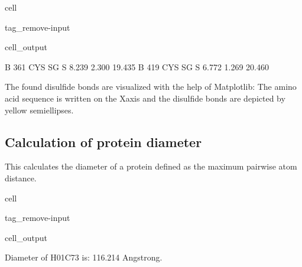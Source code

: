 \documentclass[letterpaper,10pt,english]{jupyterBook}
\begin{document}
\begin{sphinxuseclass}{cell}
\begin{sphinxuseclass}{tag_remove-input}\begin{sphinxVerbatimOutput}

\begin{sphinxuseclass}{cell_output}
\begin{sphinxVerbatim}[commandchars=\\\{\}]
    B     361  CYS SG     S        \PYGZhy{}8.239    2.300   19.435
    B     419  CYS SG     S        \PYGZhy{}6.772    1.269   20.460
\end{sphinxVerbatim}

\noindent{}

\end{sphinxuseclass}\end{sphinxVerbatimOutput}

\end{sphinxuseclass}
\end{sphinxuseclass}
\sphinxAtStartPar
The found disulfide bonds are visualized with the help of Matplotlib: The amino acid sequence is written on the X\sphinxhyphen{}axis and the disulfide bonds are depicted by yellow semi\sphinxhyphen{}ellipses.


\subsection{Calculation of protein diameter}
\label{\detokenize{ipynb/chapter1:calculation-of-protein-diameter}}
\sphinxAtStartPar
This calculates the diameter of a protein defined as the maximum pairwise atom distance.

\begin{sphinxuseclass}{cell}
\begin{sphinxuseclass}{tag_remove-input}\begin{sphinxVerbatimOutput}

\begin{sphinxuseclass}{cell_output}
\begin{sphinxVerbatim}[commandchars=\\\{\}]
\PYGZsh{} Diameter of H\PYGZus{}01C73 is: \PYGZhy{}\PYGZhy{}\PYGZhy{}\PYGZhy{}\PYGZhy{}\PYGZhy{}\PYGZhy{}\PYGZhy{}\PYGZhy{}\PYGZhy{}\PYGZhy{}\PYGZhy{}\PYGZhy{}\PYGZhy{}\PYGZhy{}\PYGZhy{}\PYGZhy{}\PYGZhy{}\PYGZhy{}\PYGZhy{}\PYGZhy{}\PYGZhy{}\PYGZhy{}116.214 Angstrong.
\end{sphinxVerbatim}

\end{sphinxuseclass}\end{sphinxVerbatimOutput}

\end{sphinxuseclass}
\end{sphinxuseclass}
\end{document}
